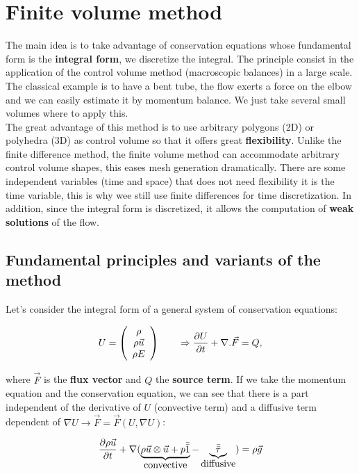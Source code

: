 \section{Finite volume method}
The main idea is to take advantage of conservation equations whose fundamental form is the \textbf{integral form}, we discretize the integral. The principle consist in the application of the control volume method (macroscopic balances) in a large scale. The classical example is to have a bent tube, the flow exerts a force on the elbow and we can easily estimate it by momentum balance. We just take several small volumes where to apply this. \\

The great advantage of this method is to use arbitrary polygons (2D) or polyhedra (3D) as control volume so that it offers great \textbf{flexibility}. Unlike the finite difference method, the finite volume method can accommodate arbitrary control volume shapes, this eases mesh generation dramatically. There are some independent variables (time and space) that does not need flexibility it is the time variable, this is why wee still use finite differences for time discretization. In addition, since the integral form is discretized, it allows the computation of \textbf{weak solutions} of the flow.

\subsection{Fundamental principles and variants of the method}
Let's consider the integral form of a general system of conservation equations: 

\begin{equation}
U = \left(
\begin{array}{c}
\rho \\
\rho \vec{u}\\
\rho E
\end{array}
 \right)
\qquad \Rightarrow \frac{\partial U}{\partial t} + \nabla . \vec{F} = Q,
\end{equation} 

where $\vec{F}$ is the \textbf{flux vector} and $Q$ the \textbf{source term}. If we take the momentum equation and the conservation equation, we can see that there is a part independent of the derivative of $U$ (convective term) and a diffusive term dependent of $\nabla U \rightarrow \vec{F} = \vec{F}(U,\nabla U)$: 

\begin{equation}
\frac{\partial \rho \vec{u}}{\partial t} + \nabla (\underbrace{\rho \vec{u}\otimes \vec{u}+ p \bar{\bar{1}}}_{\mbox{convective}}  - \underbrace{\bar{\bar{\tau}}}_{\mbox{diffusive}}) = \rho \vec{g}
\end{equation}

